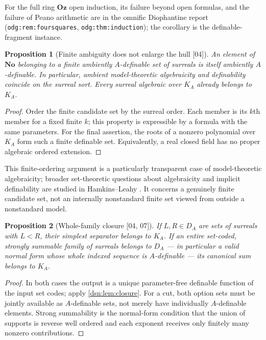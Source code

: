 \documentclass[11pt,a4paper]{article}
\numberwithin{equation}{section}
\newtheorem{proposition}[proposition]{Proposition}
\theoremstyle{definition}
\theoremstyle{remark}
\newcommand{\No}{\mathbf{No}}
\newcommand{\Oz}{\mathbf{Oz}}
\newcommand{\src}[1]{\textup{\textsf{\small[#1]}}}
\newcommand{\lbl}[1]{\nolinkurl{#1}}
\begin{document}
For the full ring $\Oz$ open induction, its failure beyond open formulas,
and the failure of Peano arithmetic are in the omnific Diophantine report
(\lbl{odg:rem:foursquares}, \lbl{odg:thm:induction}); the corollary is
the definable-fragment instance.

\begin{proposition}[Finite ambiguity does not enlarge the hull \src{04}]
\label{dsn:prop:algebraicity}
An element of $\No$ belonging to a finite ambiently $A$-definable set
of surreals is itself ambiently $A$-definable. In particular, ambient
model-theoretic algebraicity and definability coincide on the surreal
sort. Every surreal algebraic over $K_A$ already belongs to $K_A$.
\end{proposition}
\begin{proof}
Order the finite candidate set by the surreal order. Each member is
its $k$th member for a fixed finite $k$; this property is expressible
by a formula with the same parameters. For the final assertion, the
roots of a nonzero polynomial over $K_A$ form such a finite definable
set. Equivalently, a real closed field has no proper algebraic ordered
extension.
\end{proof}

This finite-ordering argument is a particularly transparent case of
model-theoretic algebraicity; broader set-theoretic questions about
algebraicity and implicit definability are studied in
Hamkins--Leahy \cite{HamkinsLeahy}. It concerns a genuinely finite
candidate set, not an internally nonstandard finite set viewed from
outside a nonstandard model.

\begin{proposition}[Whole-family closure \src{04, 07}]\label{dsn:prop:uniform}
If $L,R\in D_A$ are sets of surreals with $L<R$, their simplest separator
belongs to $K_A$. If an entire set-coded, strongly summable family of
surreals belongs to $D_A$ --- in particular a valid normal form whose
\emph{whole indexed sequence} is $A$-definable --- its canonical sum
belongs to $K_A$.
\end{proposition}
\begin{proof}
In both cases the output is a unique parameter-free definable function of
the input set codes; apply \cref{dsn:lem:closure}. For a cut, both option
sets must be jointly available as $A$-definable sets, not merely have
individually $A$-definable elements. Strong summability is the
normal-form condition that the union of supports is reverse well ordered
and each exponent receives only finitely many nonzero contributions.
\end{proof}
\end{document}
